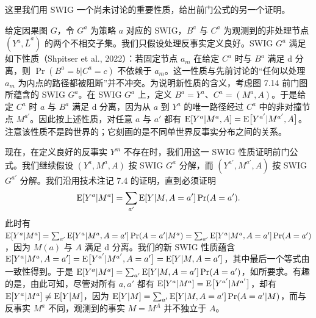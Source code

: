 \begin{techpoint}
这里我们用 SWIG 一个尚未讨论的重要性质，给出前门公式的另一个证明。

给定因果图 $G$，令 $G^a$ 为策略 $a$ 对应的 SWIG，$B^a$ 与 $C^a$ 为观测到的非处理节点 $(Y^a,\bar L^a)$ 的两个不相交子集。我们只假设处理反事实定义良好。SWIG $G^a$ 满足如下性质（Shpitser et al., 2022）：若固定节点 $a_m$ 在给定 $C^a$ 时与 $B^a$ 满足 d 分离，则 $\Pr(B^a=b|C^a=c)$ 不依赖于 $a_m$。这一性质与先前讨论的“任何以处理 $a_m$ 为内点的路径都被阻断”并不冲突。为说明新性质的含义，考虑图 7.14 前门图所蕴含的 SWIG $G^a$。在 SWIG $G^a$ 上，定义 $B^a=Y^a$、$C^a=(M^a,A)$。于是给定 $C^a$ 时 $a$ 与 $B^a$ 满足 d 分离，因为从 $a$ 到 $Y^a$ 的唯一路径经过 $C^a$ 中的非对撞节点 $M^{a'}$。因此按上述性质，对任意 $a$ 与 $a'$ 都有 $\mathrm{E}[Y^a|M^a,A]=\mathrm{E}\big[Y^{a'}|M^{a'},A\big]$。注意该性质不是跨世界的；它刻画的是不同单世界反事实分布之间的关系。

现在，在定义良好的反事实 $Y^m$ 不存在时，我们用这一 SWIG 性质证明前门公式。我们继续假设 $(Y^a,M^a,A)$ 按 SWIG $G^a$ 分解，而 $(Y^{a'},M^{a'},A)$ 按 SWIG $G^{a'}$ 分解。我们沿用技术注记 7.4 的证明，直到必须证明
\[
\mathrm{E}[Y^a|M^a]=\sum_{a'}\mathrm{E}[Y|M,A=a']\Pr(A=a').
\]
此时有 $\mathrm{E}[Y^a|M^a]=\sum_{a'}\mathrm{E}[Y^a|M^a,A=a']\Pr(A=a'|M^a)=\sum_{a'}\mathrm{E}[Y^a|M^a,A=a']\Pr(A=a')$，因为 $M(a)$ 与 $A$ 满足 d 分离。我们的新 SWIG 性质蕴含 $\mathrm{E}[Y^a|M^a,A=a']=\mathrm{E}\big[Y^{a'}|M^{a'},A=a'\big]=\mathrm{E}[Y|M,A=a']$，其中最后一个等式由一致性得到。于是 $\mathrm{E}[Y^a|M^a]=\sum_{a'}\mathrm{E}[Y|M,A=a']\Pr(A=a')$，如所要求。有趣的是，由此可知，尽管对所有 $a,a'$ 都有 $\mathrm{E}[Y^a|M^a]=\mathrm{E}\big[Y^{a'}|M^{a'}\big]$，却有 $\mathrm{E}[Y^a|M^a]\neq\mathrm{E}[Y|M]$，因为 $\mathrm{E}[Y|M]=\sum_{a'}\mathrm{E}[Y|M,A=a']\Pr(A=a'|M)$，而与反事实 $M^a$ 不同，观测到的事实 $M=M^A$ 并不独立于 $A$。
\end{techpoint}

